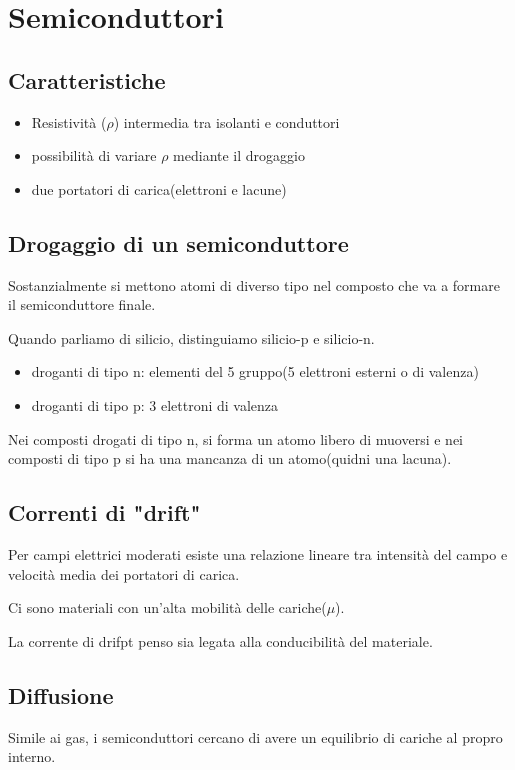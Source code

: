 \section{Semiconduttori}

\subsection{Caratteristiche}
\begin{itemize}
    \item Resistività ($\rho$) intermedia tra isolanti e conduttori
    \item possibilità di variare $\rho$ mediante il drogaggio
    \item due portatori di carica(elettroni e lacune)
\end{itemize}

\subsection{Drogaggio di un semiconduttore}
Sostanzialmente si mettono atomi di diverso tipo nel composto che va a formare il semiconduttore finale.

Quando parliamo di silicio, distinguiamo silicio-p e silicio-n.
\begin{itemize}
    \item droganti di tipo n: elementi del 5 gruppo(5 elettroni esterni o di valenza)
    \item droganti di tipo p: 3 elettroni di valenza 
\end{itemize}


Nei composti drogati di tipo n, si forma un atomo libero di muoversi e nei composti di tipo p si ha una mancanza di un atomo(quidni una lacuna).


\subsection{Correnti di "drift"}

Per campi elettrici moderati esiste una relazione lineare tra intensità del campo 
e velocità media dei portatori di carica.

Ci sono materiali con un'alta mobilità delle cariche($\mu$).

La corrente di drifpt penso sia legata alla conducibilità del materiale.

\subsection{Diffusione}
Simile ai gas, i semiconduttori cercano di avere un equilibrio di cariche al propro interno.

